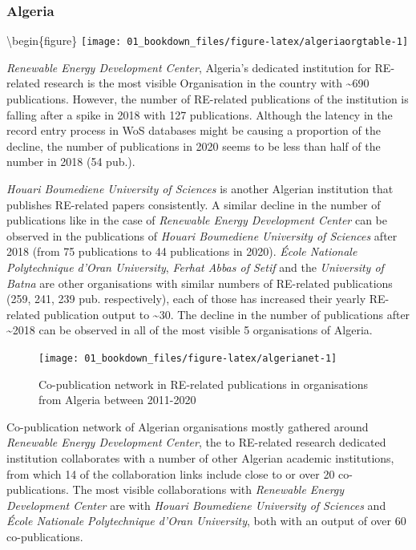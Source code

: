 \documentclass[
]{book}
\begin{document}
\hypertarget{algeria}{%
\subsubsection{Algeria}\label{algeria}}

\textbackslash begin\{figure\}
\texttt{[image: 01\_bookdown\_files/figure-latex/algeriaorgtable-1]}

\emph{Renewable Energy Development Center}, Algeria's dedicated institution for RE-related research is the most visible Organisation in the country with \textasciitilde690 publications. However, the number of RE-related publications of the institution is falling after a spike in 2018 with 127 publications. Although the latency in the record entry process in WoS databases might be causing a proportion of the decline, the number of publications in 2020 seems to be less than half of the number in 2018 (54 pub.).

\emph{Houari Boumediene University of Sciences} is another Algerian institution that publishes RE-related papers consistently. A similar decline in the number of publications like in the case of \emph{Renewable Energy Development Center} can be observed in the publications of \emph{Houari Boumediene University of Sciences} after 2018 (from 75 publications to 44 publications in 2020). \emph{École Nationale Polytechnique d'Oran University}, \emph{Ferhat Abbas of Setif} and the \emph{University of Batna} are other organisations with similar numbers of RE-related publications (259, 241, 239 pub. respectively), each of those has increased their yearly RE-related publication output to \textasciitilde30. The decline in the number of publications after \textasciitilde2018 can be observed in all of the most visible 5 organisations of Algeria.

\begin{figure}
\texttt{[image: 01\_bookdown\_files/figure-latex/algerianet-1]} \caption{Co-publication network in RE-related publications in organisations from Algeria between 2011-2020}\label{fig:algerianet}
\end{figure}

Co-publication network of Algerian organisations mostly gathered around \emph{Renewable Energy Development Center}, the to RE-related research dedicated institution collaborates with a number of other Algerian academic institutions, from which 14 of the collaboration links include close to or over 20 co-publications. The most visible collaborations with \emph{Renewable Energy Development Center} are with \emph{Houari Boumediene University of Sciences} and \emph{École Nationale Polytechnique d'Oran University}, both with an output of over 60 co-publications.
\end{document}
